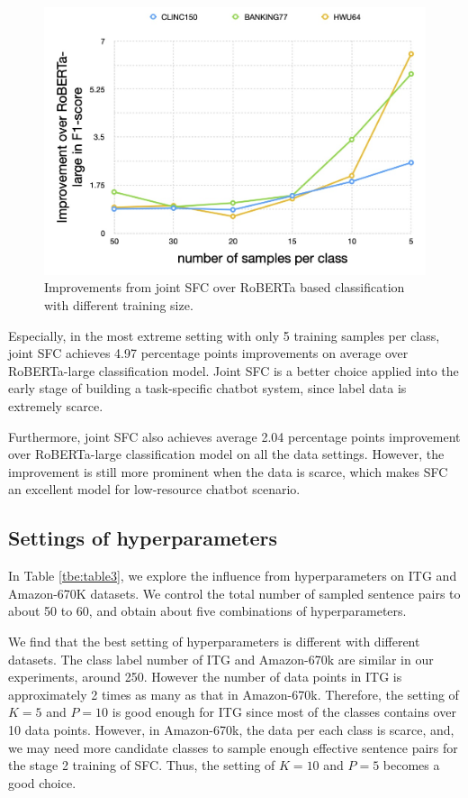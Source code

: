 \begin{figure}[t]
  \begin{centering}
    \includegraphics[scale=0.2]{picture/improvement_trend.jpg} 
    \par
  \end{centering}
  \caption{
    Improvements from joint SFC over RoBERTa based classification with different training size.
  }
  \label{fig:trend}
\end{figure}

Especially, in the most extreme setting with only 5 training samples per class, joint SFC achieves 4.97 percentage points improvements on average over RoBERTa-large classification model. 
Joint SFC is a better choice applied into the early stage of building a task-specific chatbot system, since label data is extremely scarce.

Furthermore, joint SFC also achieves average 2.04 percentage points improvement over RoBERTa-large classification model on all the data settings. 
However, the improvement is still more prominent when the data is scarce, which makes SFC an excellent model for low-resource chatbot scenario.

\subsection{Settings of hyperparameters} 
In Table \ref{tbe:table3}, we explore the influence from hyperparameters on ITG and Amazon-670K datasets. 
We control the total number of sampled sentence pairs to about 50 to 60, and obtain about five combinations of hyperparameters. 

We find that the best setting of hyperparameters is different with different datasets. 
The class label number of ITG and Amazon-670k are similar in our experiments, around 250. 
However the number of data points in ITG is approximately 2 times as many as that in Amazon-670k.
Therefore, the setting of $K=5$ and $P=10$ is good enough for ITG since most of the classes contains over 10 data points. 
However, in Amazon-670k, the data per each class is scarce, and, we may need more candidate classes to sample enough effective sentence pairs for the stage 2 training of SFC. 
Thus, the setting of $K=10$ and $P=5$ becomes a good choice. 

